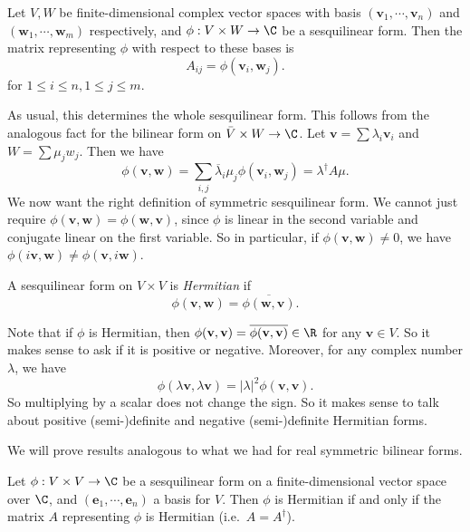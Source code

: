\documentclass[a4paper]{article}
\begin{document}
\begin{defi}
  Let $V, W$ be finite-dimensional complex vector spaces with basis $(\mathbf{v}_1, \cdots, \mathbf{v}_n)$ and $(\mathbf{w}_1, \cdots, \mathbf{w}_m)$ respectively, and $\phi: V \times W \to \C$ be a sesquilinear form. Then the matrix representing $\phi$ with respect to these bases is
  \[
    A_{ij} = \phi(\mathbf{v}_i, \mathbf{w}_j).
  \]
  for $1 \leq i \leq n, 1 \leq j \leq m$.
\end{defi}
As usual, this determines the whole sesquilinear form. This follows from the analogous fact for the bilinear form on $\bar{V} \times W \to \C$. Let $\mathbf{v} = \sum \lambda_i \mathbf{v}_i$ and $W = \sum \mu_j w_j$. Then we have
\[
  \phi(\mathbf{v}, \mathbf{w}) = \sum_{i, j} \overline{\lambda}_i \mu_j \phi(\mathbf{v}_i, \mathbf{w}_j) = \lambda^\dagger A \mu.
\]
We now want the right definition of symmetric sesquilinear form. We cannot just require $\phi(\mathbf{v}, \mathbf{w}) = \phi(\mathbf{w}, \mathbf{v})$, since $\phi$ is linear in the second variable and conjugate linear on the first variable. So in particular, if $\phi(\mathbf{v}, \mathbf{w}) \not= 0$, we have $\phi(i \mathbf{v}, \mathbf{w}) \not= \phi(\mathbf{v}, i\mathbf{w})$.

\begin{defi}
  A sesquilinear form on $V\times V$ is \emph{Hermitian} if
  \[
    \phi(\mathbf{v}, \mathbf{w}) = \overline{\phi(\mathbf{w}, \mathbf{v})}.
  \]
\end{defi}
Note that if $\phi$ is Hermitian, then $\phi(\mathbf{v}, \mathbf{v}) = \overline{\phi(\mathbf{v}, \mathbf{v})} \in \R$ for any $\mathbf{v} \in V$. So it makes sense to ask if it is positive or negative. Moreover, for any complex number $\lambda$, we have
\[
  \phi(\lambda \mathbf{v}, \lambda \mathbf{v}) = |\lambda|^2 \phi(\mathbf{v}, \mathbf{v}).
\]
So multiplying by a scalar does not change the sign. So it makes sense to talk about positive (semi-)definite and negative (semi-)definite Hermitian forms.

We will prove results analogous to what we had for real symmetric bilinear forms.
\begin{lemma}
  Let $\phi: V \times V\to \C$ be a sesquilinear form on a finite-dimensional vector space over $\C$, and $(\mathbf{e}_1, \cdots, \mathbf{e}_n)$ a basis for $V$. Then $\phi$ is Hermitian if and only if the matrix $A$ representing $\phi$ is Hermitian (i.e.\ $A = A^\dagger$).
\end{lemma}
\end{document}
